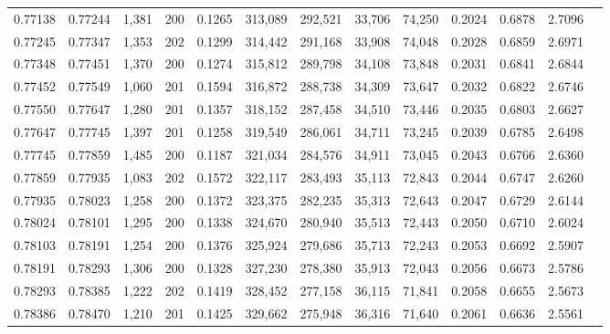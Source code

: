 \begin{tabular}{rrrrrrrrrrrrr}
0.77138 & 0.77244 & 1,381 & 200 &                                     0.1265 & 313,089 & 292,521 &  33,706 &  74,250 & 0.2024 & 0.6878 & 2.7096 \\
0.77245 & 0.77347 & 1,353 & 202 &                                     0.1299 & 314,442 & 291,168 &  33,908 &  74,048 & 0.2028 & 0.6859 & 2.6971 \\
0.77348 & 0.77451 & 1,370 & 200 &                                     0.1274 & 315,812 & 289,798 &  34,108 &  73,848 & 0.2031 & 0.6841 & 2.6844 \\
0.77452 & 0.77549 & 1,060 & 201 &                                     0.1594 & 316,872 & 288,738 &  34,309 &  73,647 & 0.2032 & 0.6822 & 2.6746 \\
0.77550 & 0.77647 & 1,280 & 201 &                                     0.1357 & 318,152 & 287,458 &  34,510 &  73,446 & 0.2035 & 0.6803 & 2.6627 \\
0.77647 & 0.77745 & 1,397 & 201 &                                     0.1258 & 319,549 & 286,061 &  34,711 &  73,245 & 0.2039 & 0.6785 & 2.6498 \\
0.77745 & 0.77859 & 1,485 & 200 &                                     0.1187 & 321,034 & 284,576 &  34,911 &  73,045 & 0.2043 & 0.6766 & 2.6360 \\
0.77859 & 0.77935 & 1,083 & 202 &                                     0.1572 & 322,117 & 283,493 &  35,113 &  72,843 & 0.2044 & 0.6747 & 2.6260 \\
0.77935 & 0.78023 & 1,258 & 200 &                                     0.1372 & 323,375 & 282,235 &  35,313 &  72,643 & 0.2047 & 0.6729 & 2.6144 \\
0.78024 & 0.78101 & 1,295 & 200 &                                     0.1338 & 324,670 & 280,940 &  35,513 &  72,443 & 0.2050 & 0.6710 & 2.6024 \\
0.78103 & 0.78191 & 1,254 & 200 &                                     0.1376 & 325,924 & 279,686 &  35,713 &  72,243 & 0.2053 & 0.6692 & 2.5907 \\
0.78191 & 0.78293 & 1,306 & 200 &                                     0.1328 & 327,230 & 278,380 &  35,913 &  72,043 & 0.2056 & 0.6673 & 2.5786 \\
0.78293 & 0.78385 & 1,222 & 202 &                                     0.1419 & 328,452 & 277,158 &  36,115 &  71,841 & 0.2058 & 0.6655 & 2.5673 \\
0.78386 & 0.78470 & 1,210 & 201 &                                     0.1425 & 329,662 & 275,948 &  36,316 &  71,640 & 0.2061 & 0.6636 & 2.5561 \\

\end{tabular}

